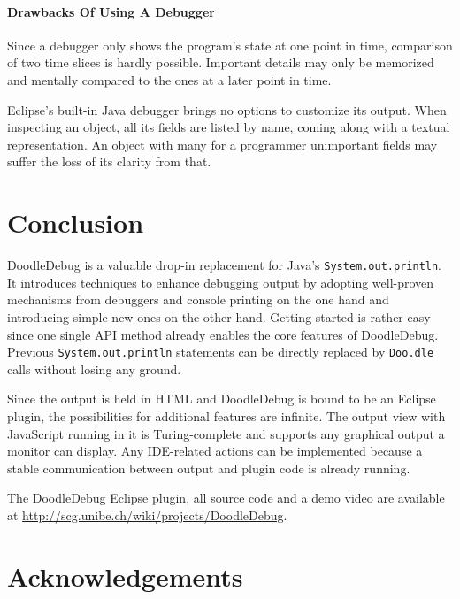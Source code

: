\documentclass[english]{scrartcl}
\newcommand{\DD}{Dood\-le\-De\-bug\xspace}
\newcommand{\Doodle}{\texttt{Doo.\-dle}\xspace}
\newcommand{\println}{\texttt{Sys\-tem.\-out.\-println}\xspace}
\begin{document}
\paragraph{Drawbacks Of Using A Debugger}
Since a debugger only shows the program's state at one point in time, comparison of two time slices is hardly possible.
Important details may only be memorized and mentally compared to the ones at a later point in time.

Eclipse's built-in Java debugger brings no options to customize its output.
When inspecting an object, all its fields are listed by name, coming along with a textual representation.
An object with many for a programmer unimportant fields may suffer the loss of its clarity from that.


\section{Conclusion}
\DD is a valuable drop-in replacement for Java's \println.
It introduces techniques to enhance debugging output by adopting well-proven mechanisms from debuggers and console printing on the one hand and introducing simple new ones on the other hand.
Getting started is rather easy since one single API method already enables the core features of \DD.
Previous \println statements can be directly replaced by \Doodle calls without losing any ground.

Since the output is held in HTML and \DD is bound to be an Eclipse plugin, the possibilities for additional features are infinite.
The output view with JavaScript running in it is Turing-complete and supports any graphical output a monitor can display.
Any IDE-related actions can be implemented because a stable communication between output and plugin code is already running.

The DoodleDebug Eclipse plugin, all source code and a demo video are available at \url{http://scg.unibe.ch/wiki/projects/DoodleDebug}.

\section{Acknowledgements}



{}
\end{document}
